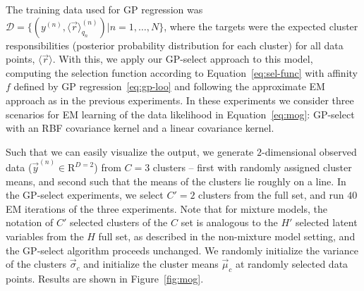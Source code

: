 The training data used for GP regression was $\mathcal{D} = \{ (y^{(n)}, \langle \vec{r}\rangle_{q_{n}}^{(n)}) | n = 1, \dots, N \}$, where the targets were the expected cluster responsibilities (posterior probability distribution for each cluster) for all data points, $\langle \vec{r} \rangle$.
With this, we apply our GP-select approach to this model, computing the selection function according to Equation~\eqref{eq:sel-func} with affinity $f$ defined by GP regression~\eqref{eq:gp-loo} 
and following the approximate EM approach as in the previous experiments.
%
In these experiments we consider three scenarios for EM learning of the data likelihood in Equation~\eqref{eq:mog}: GP-select with an RBF covariance kernel and a linear covariance kernel.%
%

Such that we can easily visualize the output, we generate $2$-dimensional observed data ($\vec{y}^{(n)} \in \mathrm{R}^{D=2} $) from $C=3$ clusters -- first with randomly assigned cluster means, and second such that the means of the clusters lie roughly on a line.
In the GP-select experiments, we select $C' = 2$ clusters from the full set,
and run $40$ EM iterations of the three experiments.
Note that for mixture models, the notation of $C'$ selected clusters of the $C$ set is analogous to the $H'$ selected latent variables from the $H$ full set, as described in the non-mixture model setting, and the GP-select algorithm proceeds unchanged.
We randomly initialize the variance of the clusters $\vec{\sigma}_c$ and initialize the cluster means $\vec{\mu}_c$ at randomly selected data points.
Results are shown in Figure~\ref{fig:mog}.

